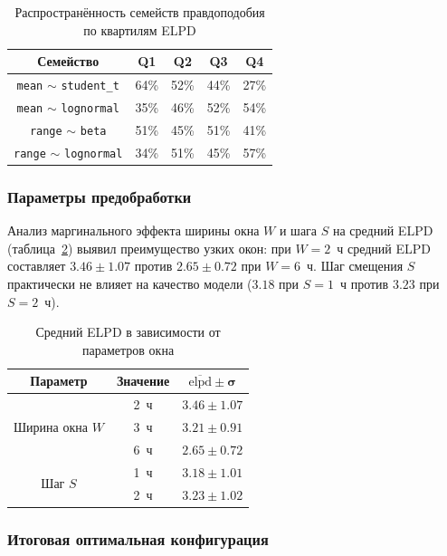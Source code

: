 \documentclass[14pt]{mmcs_article}
\begin{document}
\begin{table}[H]
	\centering
	\caption{Распространённость семейств правдоподобия 
		по квартилям ELPD}
	\label{tab:lik_prevalence}
	\begin{tabular}{|c|c|c|c|c|}
		\hline
		\textbf{Семейство} & \textbf{Q1} & \textbf{Q2} & 
		\textbf{Q3} & \textbf{Q4} \\
		\hline
		\texttt{mean} $\sim$ \texttt{student\_t} & 64\% & 52\% & 44\% & 27\% \\
		\hline
		\texttt{mean} $\sim$ \texttt{lognormal} & 35\% & 46\% & 52\% & 54\% \\
		\hline
		\texttt{range} $\sim$ \texttt{beta} & 51\% & 45\% & 51\% & 41\% \\
		\hline
		\texttt{range} $\sim$ \texttt{lognormal} & 34\% & 51\% & 45\% & 57\% \\
		\hline
	\end{tabular}
\end{table}

\subsubsection*{Параметры предобработки}

Анализ маргинального эффекта ширины окна $W$ и шага $S$ на
средний ELPD (таблица~\ref{tab:window_effect}) выявил
преимущество узких окон: при $W = 2$~ч средний ELPD составляет
$3.46 \pm 1.07$ против $2.65 \pm 0.72$ при $W = 6$~ч. Шаг
смещения $S$ практически не влияет на качество модели ($3.18$
при $S = 1$~ч против $3.23$ при $S = 2$~ч).

\begin{table}[H]
	\centering
	\caption{Средний ELPD в зависимости от параметров окна}
	\label{tab:window_effect}
	\begin{tabular}{|c|c|c|}
		\hline
		\textbf{Параметр} & \textbf{Значение} & 
		$\boldsymbol{\overline{\mathrm{elpd}} \pm \sigma}$ \\
		\hline
		\multirow{3}{*}{Ширина окна $W$} & 2~ч & $3.46 \pm 1.07$ \\
		& 3~ч & $3.21 \pm 0.91$ \\
		& 6~ч & $2.65 \pm 0.72$ \\
		\hline
		\multirow{2}{*}{Шаг $S$} & 1~ч & $3.18 \pm 1.01$ \\
		& 2~ч & $3.23 \pm 1.02$ \\
		\hline
	\end{tabular}
\end{table}

\subsubsection*{Итоговая оптимальная конфигурация}
\end{document}
